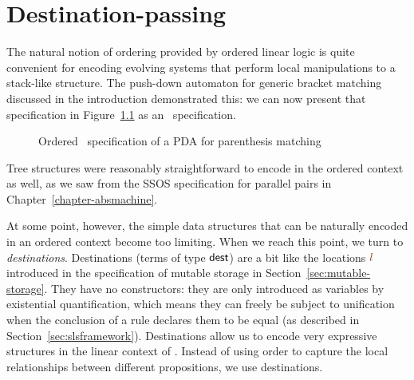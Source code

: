 \chapter{Destination-passing}
\label{chapter-destinations}

The natural notion of ordering provided by ordered linear logic is
quite convenient for encoding evolving systems that perform local
manipulations to a stack-like structure.  The push-down
automaton for generic bracket matching discussed in the introduction
demonstrated this: we can now present that specification in
Figure~\ref{fig:pda-ord} as an \sls~specification.

\begin{figure}[ht]
\caption{Ordered \sls~specification of a PDA for parenthesis matching}
\label{fig:pda-ord}
\end{figure}

\noindent
Tree structures were reasonably straightforward to encode in the
ordered context as well, as we saw from the SSOS specification for
parallel pairs in Chapter~\ref{chapter-absmachine}. 

At some point, however, the simple data structures that can be
naturally encoded in an ordered context become too limiting. When we
reach this point, we turn to {\it destinations}. Destinations (terms
of type ${\sf dest}$) are a bit like the locations $\lf l$ introduced
in the specification of mutable storage in
Section~\ref{sec:mutable-storage}. They have no constructors: they are
only introduced as variables by existential quantification, which
means they can freely be subject to unification when the conclusion of
a rule declares them to be equal (as described in
Section~\ref{sec:slsframework}). Destinations allow us to encode very
expressive structures in the linear context of \sls. Instead of using
order to capture the local relationships between different propositions,
we use destinations. 

